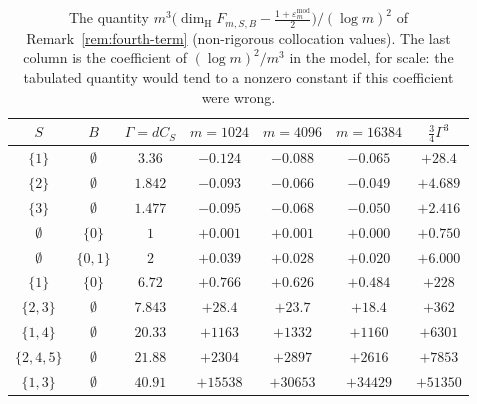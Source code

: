 \documentclass[11pt]{article}
\theoremstyle{definition}
\theoremstyle{remark}
\newcommand{\dimH}{\dim_{\mathrm{H}}}
\begin{document}
\begin{table}[ht]
\centering\small\setlength{\tabcolsep}{4pt}
\begin{tabular}{c|c|c|ccc|c}
$S$ & $B$ & $\Gamma=dC_S$ & $m=1024$ & $m=4096$ & $m=16384$ & $\frac34\Gamma^3$ \\\hline
$\{1\}$ & $\emptyset$ & $3.36$ & $-0.124$ & $-0.088$ & $-0.065$ & $+28.4$ \\
$\{2\}$ & $\emptyset$ & $1.842$ & $-0.093$ & $-0.066$ & $-0.049$ & $+4.689$ \\
$\{3\}$ & $\emptyset$ & $1.477$ & $-0.095$ & $-0.068$ & $-0.050$ & $+2.416$ \\
$\emptyset$ & $\{0\}$ & $1$ & $+0.001$ & $+0.001$ & $+0.000$ & $+0.750$ \\
$\emptyset$ & $\{0,1\}$ & $2$ & $+0.039$ & $+0.028$ & $+0.020$ & $+6.000$ \\
$\{1\}$ & $\{0\}$ & $6.72$ & $+0.766$ & $+0.626$ & $+0.484$ & $+228$ \\
$\{2,3\}$ & $\emptyset$ & $7.843$ & $+28.4$ & $+23.7$ & $+18.4$ & $+362$ \\
$\{1,4\}$ & $\emptyset$ & $20.33$ & $+1163$ & $+1332$ & $+1160$ & $+6301$ \\
$\{2,4,5\}$ & $\emptyset$ & $21.88$ & $+2304$ & $+2897$ & $+2616$ & $+7853$ \\
$\{1,3\}$ & $\emptyset$ & $40.91$ & $+15538$ & $+30653$ & $+34429$ & $+51350$ \\
\end{tabular}
\caption{The quantity $m^3\bigl(\dimH F_{m,S,B}-\frac{1+\varepsilon_m^{\mathrm{mod}}}{2}\bigr)/(\log m)^2$
of Remark~\ref{rem:fourth-term} (non-rigorous collocation values). The last column is the
coefficient of $(\log m)^2/m^3$ in the model, for scale: the tabulated quantity would tend to a
nonzero constant if this coefficient were wrong.}\label{tab:fourth-term}
\end{table}
\end{document}
